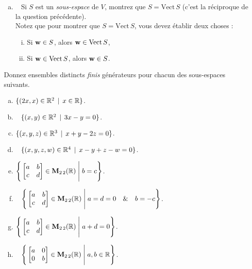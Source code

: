 \begin{prob}
\begin{enumerate}[a)]
\item\sov~ Si $S$ est un {\it sous-espace} de $V$, montrez que $S= \text{Vect}\, S$ (c'est la réciproque de la question précédente).\\
Notez que pour montrer que $S= \text{Vect}\, S$, vous devez établir deux choses :
\begin{enumerate}[(i)]
\item Si $\mathbf{w}\in S$, alors $\mathbf{w}\in \text{Vect}\, S$,

\item Si $\mathbf{w}\in \text{Vect}\, S$, alors $\mathbf{w}\in S$.
\end{enumerate}
\medskip


\end{enumerate}

\end{prob} \begin{prob} \label{prob06.3} Donnez  ensembles distincts {\it finis} g\'en\'erateurs pour chacun des sous-espaces suivants.
\medskip

\begin{enumerate}[(a)]

\item  $\{(2x, x) \in \mathbb{R}^2\, \mid \, x\in \mathbb{R}\}$.\medskip

\item\sov~ $\{(x, y) \in \mathbb{R}^2\, \mid \, 3x - y=0 \}$. \medskip




\item  $\{(x, y, z) \in \mathbb{R}^3\, \mid \, x+y-2z=0 \}$.   \medskip


\item\sov~ $\{(x, y, z, w) \in \mathbb{R}^4\, \mid \, x-y+z-w=0 \}$.   \medskip


\item  $\Bigg\{  \bmatrix a&b\\ c&d\endbmatrix \in \M_{2 \,2}(\R) \;\Bigg|\; b=c\Bigg\}$.\medskip \medskip

\item\sov~ $\Bigg\{  \bmatrix a&b\\ c&d\endbmatrix \in \M_{2 \,2}(\R) \;\Bigg|\;a=d=0\quad \&\quad b=-c  \Bigg\}$.\medskip \medskip

\item  $\Bigg\{  \bmatrix a&b\\ c&d\endbmatrix \in \M_{2 \,2}(\R) \;\Bigg|\; a+d=0\Bigg\}$. \medskip


\item\sov~ $\Bigg\{  \bmatrix a&0\\ 0&b\endbmatrix \in \M_{2 \,2}(\R) \;\Bigg|\;  a, b \in \R\Bigg\}$. \medskip




\end{enumerate}
\end{prob}
